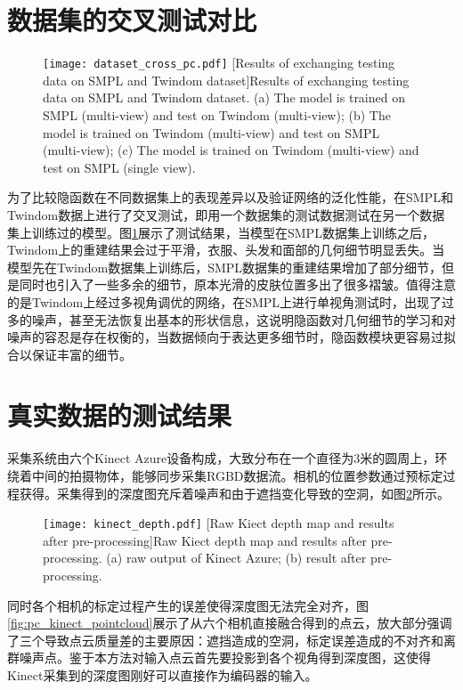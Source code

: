 \section{数据集的交叉测试对比}
\begin{figure}[!htbp]
    \centering
    \texttt{[image: dataset\_cross\_pc.pdf]}
    [Results of exchanging testing data on SMPL and Twindom dataset]{Results of exchanging testing data on SMPL and Twindom dataset. (a) The model is trained on SMPL (multi-view) and test on Twindom (multi-view); (b) The model is trained on Twindom (multi-view) and test on SMPL (multi-view); (c) The model is trained on Twindom (multi-view) and test on SMPL (single view).}
    \label{fig:pc_data_cross}
\end{figure}
为了比较隐函数在不同数据集上的表现差异以及验证网络的泛化性能，在SMPL和Twindom数据上进行了交叉测试，即用一个数据集的测试数据测试在另一个数据集上训练过的模型。图\ref{fig:pc_data_cross}展示了测试结果，当模型在SMPL数据集上训练之后，Twindom上的重建结果会过于平滑，衣服、头发和面部的几何细节明显丢失。当模型先在Twindom数据集上训练后，SMPL数据集的重建结果增加了部分细节，但是同时也引入了一些多余的细节，原本光滑的皮肤位置多出了很多褶皱。值得注意的是Twindom上经过多视角调优的网络，在SMPL上进行单视角测试时，出现了过多的噪声，甚至无法恢复出基本的形状信息，这说明隐函数对几何细节的学习和对噪声的容忍是存在权衡的，当数据倾向于表达更多细节时，隐函数模块更容易过拟合以保证丰富的细节。



\section{真实数据的测试结果}
采集系统由六个Kinect Azure设备构成，大致分布在一个直径为3米的圆周上，环绕着中间的拍摄物体，能够同步采集RGBD数据流。相机的位置参数通过预标定过程获得。采集得到的深度图充斥着噪声和由于遮挡变化导致的空洞，如图\ref{fig:pc_kinect_depth}所示。
\begin{figure}[!htbp]
    \centering
    \texttt{[image: kinect\_depth.pdf]}
    [Raw Kiect depth map and results after pre-processing]{Raw Kiect depth map and results after pre-processing. (a) raw output of Kinect Azure; (b) result after pre-processing.}
    \label{fig:pc_kinect_depth}
\end{figure}
同时各个相机的标定过程产生的误差使得深度图无法完全对齐，图\ref{fig:pc_kinect_pointcloud}展示了从六个相机直接融合得到的点云，放大部分强调了三个导致点云质量差的主要原因：遮挡造成的空洞，标定误差造成的不对齐和离群噪声点。鉴于本方法对输入点云首先要投影到各个视角得到深度图，这使得Kinect采集到的深度图刚好可以直接作为编码器的输入。

